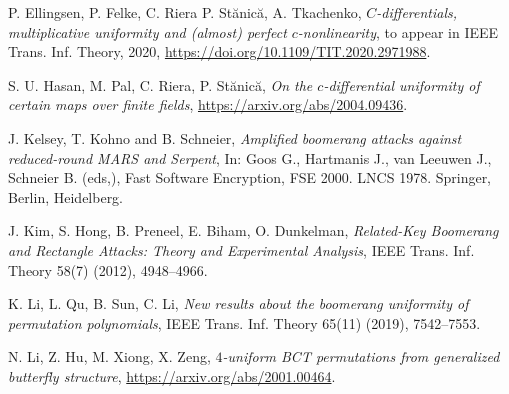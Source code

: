 \documentclass[11pt]{article}
\begin{document}
\begin{thebibliography}{99}


P. Ellingsen, P. Felke, C. Riera P. St\u anic\u a, A. Tkachenko,
{\em $C$-differentials, multiplicative uniformity and (almost) perfect $c$-nonlinearity}, to appear in IEEE Trans. Inf. Theory, 2020, \url{https://doi.org/10.1109/TIT.2020.2971988}.

S. U. Hasan, M. Pal, C. Riera, P. St\u anic\u a,
{\em On the $c$-differential uniformity of certain maps over finite fields}, 
\url{https://arxiv.org/abs/2004.09436}.




J. Kelsey, T. Kohno and B. Schneier, {\em Amplified boomerang attacks against reduced-round MARS and Serpent},  In: Goos G., Hartmanis J., van Leeuwen J., Schneier B. (eds,), 
Fast Software Encryption, FSE 2000. LNCS 1978. Springer, Berlin, Heidelberg.

J. Kim, S. Hong, B. Preneel, E. Biham, O. Dunkelman,
{\em Related-Key Boomerang and Rectangle Attacks: Theory and Experimental Analysis}, IEEE Trans. Inf. Theory 58(7) (2012),  4948--4966.

K. Li, L. Qu, B. Sun, C. Li, {\em New results about the boomerang uniformity of permutation polynomials}, IEEE Trans. Inf. Theory 65(11) (2019), 7542--7553.

N. Li, Z. Hu, M. Xiong, X. Zeng, {\em $4$-uniform BCT permutations from generalized
butterfly structure}, \url{https://arxiv.org/abs/2001.00464}.



\end{thebibliography}
\end{document}
